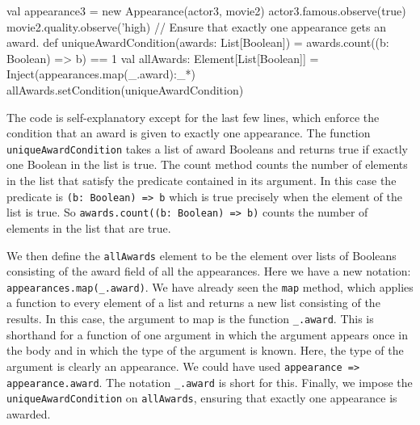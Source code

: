 \begin{flushleft}
{\newline val appearance3 = new Appearance(actor3, movie2) 
\newline actor3.famous.observe(true) 
\newline movie2.quality.observe('high)
\newline 
{}
\newline // Ensure that exactly one appearance gets an award. 
\newline def uniqueAwardCondition(awards: List[Boolean]) =
\newline \tab awards.count((b: Boolean) => b) == 1
\newline val allAwards: Element[List[Boolean]] = 
\newline \tab Inject(appearances.map(\_.award):\_*)
\newline allAwards.setCondition(uniqueAwardCondition)}
\end{flushleft}

The code is self-explanatory except for the last few lines, which enforce the condition that an award is given to exactly one appearance. The function \texttt{uniqueAwardCondition} takes a list of award Booleans and returns true if exactly one Boolean in the list is true. The count method counts the number of elements in the list that satisfy the predicate contained in its argument. In this case the predicate is \texttt{(b: Boolean) => b} which is true precisely when the element of the list is true. So \texttt{awards.count((b: Boolean) => b)} counts the number of elements in the list that are true.

We then define the \texttt{allAwards} element to be the element over lists of Booleans consisting of the award field of all the appearances.  Here we have a new notation: \texttt{appearances.map(\_.award)}. We have already seen the \texttt{map} method, which applies a function to every element of a list and returns a new list consisting of the results. In this case, the argument to map is the function \texttt{\_.award}. This is shorthand for a function of one argument in which the argument appears once in the body and in which the type of the argument is known. Here, the type of the argument is clearly an appearance. We could have used \texttt{appearance => appearance.award}. The notation \texttt{\_.award} is short for this. Finally, we impose the \texttt{uniqueAwardCondition} on \texttt{allAwards}, ensuring that exactly one appearance is awarded.

